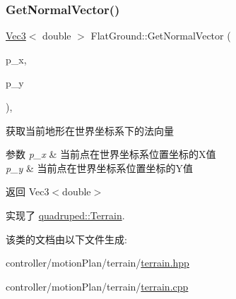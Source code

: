 \subsubsection{\texorpdfstring{Get\+Normal\+Vector()}{GetNormalVector()}}
{\footnotesize\ttfamily \hyperlink{cppTypes_8h_a65c27bf97693676535dd0b30ea0ad399}{Vec3}$<$ double $>$ Flat\+Ground\+::\+Get\+Normal\+Vector (\begin{DoxyParamCaption}\item[{double}]{p\+\_\+x,  }\item[{double}]{p\+\_\+y }\end{DoxyParamCaption})\hspace{0.3cm}{\ttfamily [override]}, {\ttfamily [virtual]}}



获取当前地形在世界坐标系下的法向量 


\begin{DoxyParams}{参数}
{\em p\+\_\+x} & 当前点在世界坐标系位置坐标的\+X值 \\
\hline
{\em p\+\_\+y} & 当前点在世界坐标系位置坐标的\+Y值 \\
\hline
\end{DoxyParams}
\begin{DoxyReturn}{返回}
Vec3$<$double$>$ 
\end{DoxyReturn}


实现了 \hyperlink{classquadruped_1_1Terrain}{quadruped\+::\+Terrain}.



该类的文档由以下文件生成\+:\begin{DoxyCompactItemize}
\item 
controller/motion\+Plan/terrain/\hyperlink{terrain_8hpp}{terrain.\+hpp}\item 
controller/motion\+Plan/terrain/\hyperlink{terrain_8cpp}{terrain.\+cpp}\end{DoxyCompactItemize}
